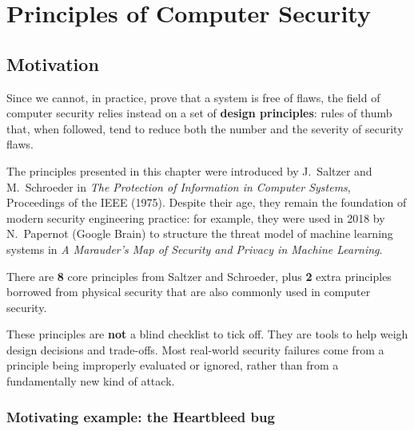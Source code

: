 
\chapter{Principles of Computer Security}
\label{ch:principles}

\section{Motivation}

Since we cannot, in practice, prove that a system is free of flaws, the field of computer security relies instead on a set of \textbf{design principles}: rules of thumb that, when followed, tend to reduce both the number and the severity of security flaws.

\begin{remark}
The principles presented in this chapter were introduced by J.\ Saltzer and M.\ Schroeder in \emph{The Protection of Information in Computer Systems}, Proceedings of the IEEE (1975). Despite their age, they remain the foundation of modern security engineering practice: for example, they were used in 2018 by N.\ Papernot (Google Brain) to structure the threat model of machine learning systems in \emph{A Marauder's Map of Security and Privacy in Machine Learning}.
\end{remark}

There are \textbf{8} core principles from Saltzer and Schroeder, plus \textbf{2} extra principles borrowed from physical security that are also commonly used in computer security.

\begin{remark}
These principles are \textbf{not} a blind checklist to tick off. They are tools to help weigh design decisions and trade-offs. Most real-world security failures come from a principle being improperly evaluated or ignored, rather than from a fundamentally new kind of attack.
\end{remark}

\subsection{Motivating example: the Heartbleed bug}

